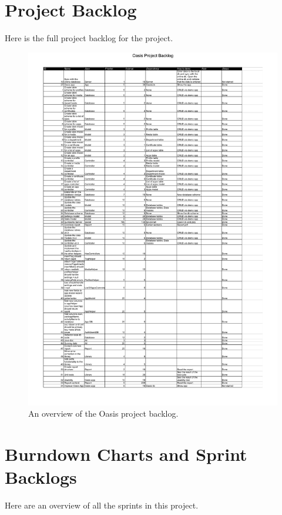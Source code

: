 

\chapter{Project Backlog}
\label{sec:projectBacklog}
Here is the full project backlog for the project.

\begin{figure}[H]
	\centering
		\includegraphics[width=\textwidth]{Images/OasisProjectBacklog}
	\caption{An overview of the Oasis project backlog.}
	\label{fig:projectBacklog}
\end{figure}

\chapter{Burndown Charts and Sprint Backlogs}
\label{sec:burn_back}
Here are an overview of all the sprints in this project.
	
